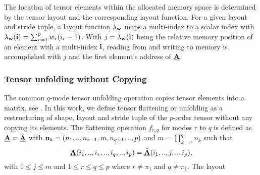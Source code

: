 The location of tensor elements within the allocated memory space is determined by the tensor layout and the corresponding layout function.
For a given layout and stride tuple, a layout function $\lambda_{\mathbf{w}}$ maps a multi-index to a scalar index with $\lambda_{\mathbf{w}}(\mathbf{i}) = \sum_{r=1}^p w_r (i_r-1)$.
With $j = \lambda_{\mathbf{w}} (\mathbf{i})$ being the relative memory position of an element with a multi-index $\mathbf{i}$, reading from and writing to memory is accomplished with $j$ and the first element's address of $\underline{\mathbf{A}}$.


\subsubsection{Tensor unfolding without Copying}
The common $q$-mode tensor unfolding operation copies tensor elements into a matrix, see \cite[p.459]{kolda:2009:decompositions}.
In this work, we define tensor flattening or unfolding as a restructuring of shape, layout and stride tuple of the $p$-order tensor without any copying its elements.
The flattening operation $f_{r,q}$ for modes $r$ to $q$ is defined as $\underline{\mathbf{A}} = \hat{\underline{\mathbf{A}}}$ with $\mathbf{n}_{\hat{a}} = (n_1,..,n_{r-1},m,n_{q+1},..,p)$ and $m = \prod_{k=r}^q n_k$ such that 
\begin{equation}
\underline{\mathbf{A}}(i_1,..,i_r,..,i_q,..,i_p) = \hat{\underline{\mathbf{A}}}(i_1,..,j,..,i_p),
\end{equation}
with $1 \leq j \leq m$ and $1 \leq r \leq q \leq p$ where $r \neq \pi_1$ and $q \neq \pi_1$.
The layout 




